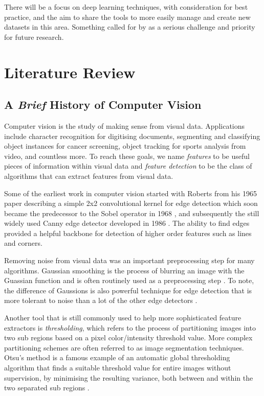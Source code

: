 There will be a focus on deep learning techniques, with consideration for best practice, and the aim to share the
tools to more easily manage and create new datasets in this area.  Something
called for by \cite{Ding2016ChessVisionC} as a serious challenge and priority for future research.


\section{Literature Review}
\label{research}


\subsection{A \textit{Brief} History of Computer Vision}
\label{a breif history}
Computer vision is the study of making sense from visual data.  Applications include character recognition for digitising documents, segmenting and classifying
object instances for cancer screening, object tracking for sports analysis from video, and countless more.
To reach these goals, we name \textit{features} to be useful pieces of information within visual data and \textit{feature detection} to be
the class of algorithms that can extract features from visual data.

Some of the earliest work in computer vision started with Roberts from his 1965 paper \cite{roberts} describing a simple 2x2 convolutional
kernel for edge detection which soon became the predecessor to the Sobel operator in 1968 \cite{sobel}, and subsequently the still widely used
Canny edge detector developed in 1986 \cite{canny}. The ability to find edges provided a helpful backbone for detection of higher order features such as lines and corners.

Removing noise from visual data was an important preprocessing step for many algorithms.  Gaussian smoothing is the process of blurring an image with the Guassian
function and is often routinely used as a preprocessing step \cite{gaussiansmoothing}.   To note, the difference of Gaussions is also powerful technique for edge detection that is more tolerant to noise than a lot of the other
edge detectors \cite{dog}.

Another tool that is still commonly used to help more sophisticated feature extractors is \textit{thresholding}, which refers to the process of
partitioning images into two sub regions based on a pixel color/intensity threshold value.
More complex partitioning schemes are often referred to as image segmentation techniques.
Otsu's method is a famous example of an automatic global thresholding algorithm that finds a suitable threshold value for entire images without supervision,
by minimising the resulting variance, both between and within the two separated sub regions \cite{otsu}.

